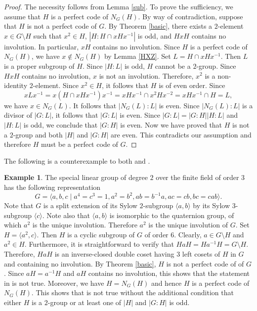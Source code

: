 \documentclass[12pt, a4paper]{article}
\theoremstyle{definition}
\newtheorem*{exam}{Example}
\begin{document}
\begin{proof}
The necessity follows from Lemma \ref{sub}. To prove the sufficiency, we assume that $H$ is a perfect code of $N_{G}(H)$. By way of contradiction, suppose that $H$ is not a perfect code of $G$. By Theorem \ref{basic}, there exists a $2$-element $x\in G\setminus H$ such that $x^2\in H$, $|H:H\cap xHx^{-1}|$ is odd, and $HxH$ contains no involution. In particular, $xH$ contains no involution. Since $H$ is a perfect code of $N_{G}(H)$, we have $x\notin N_{G}(H)$ by Lemma \ref{HXZ}. Set $L=H\cap xHx^{-1}$. Then $L$ is a proper subgroup of $H$. Since $|H:L|$ is odd, $H$ cannot be a $2$-group. Since $HxH$ contains no involution, $x$ is not an involution. Therefore, $x^2$ is a non-identity $2$-element. Since $x^2\in H$, it follows that $H$ is of even order. Since
\begin{equation*}
xLx^{-1} = x(H\cap xHx^{-1})x^{-1} = xHx^{-1}\cap x^2Hx^{-2} = xHx^{-1}\cap H = L,
\end{equation*}
we have $x\in N_{G}(L)$. It follows that $|N_{G}(L):L|$ is even. Since $|N_{G}(L):L|$ is a divisor of $|G:L|$, it follows that $|G:L|$ is even. Since $|G:L|=|G:H||H:L|$ and $|H:L|$ is odd, we conclude that $|G:H|$ is even. Now we have proved that $H$ is not a $2$-group and both $|H|$ and $|G:H|$ are even. This contradicts our assumption and therefore $H$ must be a perfect code of $G$.
\end{proof}

The following is a counterexample to both \cite[Theorem 3.1]{ZZ21} and \cite[Theorem 3.2]{ZZ21}. 

\begin{exam}
\label{example}
The special linear group of degree $2$ over the finite field of order $3$ has the following representation
\begin{equation*}
G=\langle a,b,c\mid a^4=c^3=1, a^2=b^2, ab=b^{-1}a, ac=cb, bc=cab\rangle.
\end{equation*}
Note that $G$ is a split extension of its Sylow $2$-subgroup $\langle a,b\rangle$ by its Sylow $3$-subgroup $\langle c\rangle$. Note also that $\langle a,b\rangle$ is isomorphic to the quaternion group, of which $a^2$ is the unique involution. Therefore $a^2$ is the unique involution of $G$. Set $H=\langle a^2,c\rangle$. Then $H$ is a cyclic subgroup of $G$ of order $6$. Clearly, $a\in G\setminus H$ and $a^{2}\in H$. Furthermore, it is straightforward to verify that $HaH=Ha^{-1}H=G\setminus H$. Therefore, $HaH$ is an inverse-closed double coset having $3$ left cosets of $H$ in $G$ and containing no involution. By Theorem \ref{basic}, $H$ is not a perfect code of of $G$. Since $aH=a^{-1}H$ and $aH$ contains no involution, this shows that the statement in \cite[Theorem 3.1]{ZZ21} is not true. Moreover, we have $H=N_{G}(H)$ and hence $H$ is a perfect code of $N_{G}(H)$. This shows that \cite[Theorem 3.2]{ZZ21} is not true without the additional condition that either $H$ is a $2$-group or at least one of $|H|$ and $|G:H|$ is odd.
\end{exam}
\end{document}

